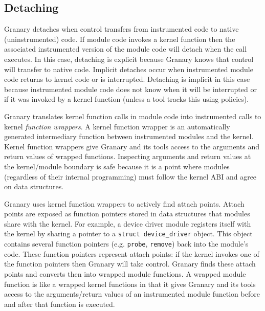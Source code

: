 \documentclass[letterpaper,twocolumn,10pt]{article}
\newcommand{\comment}[1]{}
\begin{document}

\subsection{Detaching}

Granary detaches when control transfers from instrumented code to native (uninstrumented) code. If module code invokes a kernel function then the associated instrumented version of the module code will detach when the call executes. In this case, detaching is explicit because Granary knows that control will transfer to native code. Implicit detaches occur when instrumented module code returns to kernel code or is interrupted. Detaching is implicit in this case because instrumented module code does not know when it will be interrupted or if it was invoked by a kernel function (unless a tool tracks this using policies). 


Granary translates kernel function calls in module code into instrumented calls to kernel \emph{function wrappers}. A kernel function wrapper is an automatically generated intermediary function between instrumented modules and the kernel. Kernel function wrappers give Granary and its tools access to the arguments and return values of wrapped functions. Inspecting arguments and return values at the kernel/module boundary is safe because it is a point where modules (regardless of their internal programming) must follow the kernel ABI and agree on data structures.

Granary uses kernel function wrappers to actively find attach points. Attach points are exposed as function pointers stored in data structures that modules share with the kernel. For example, a device driver module registers itself with the kernel by sharing a pointer to a \texttt{struct device\_driver} object. This object contains several function pointers (e.g. \texttt{probe}, \texttt{remove}) back into the module's code. These function pointers represent attach points: if the kernel invokes one of the function pointers then Granary will take control. Granary finds these attach points and converts then into wrapped module functions. A wrapped module function is like a wrapped kernel functions in that it gives Granary and its tools access to the arguments/return values of an instrumented module function before and after that function is executed.
\end{document}
